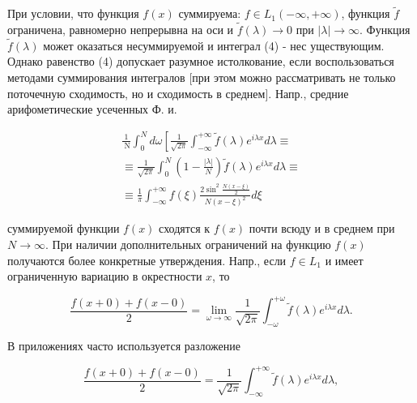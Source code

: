 \documentclass[10pt]{article}
\begin{document}
При условии, что функция $f(x)$ суммируема: $f \in L_{1}(-\infty,+\infty)$, функция $\tilde{f}$ ограничена, равномерно непрерывна на оси и $\tilde{f}(\lambda) \longrightarrow 0$ при $|\lambda| \longrightarrow \infty$. Функция $\tilde{f}(\lambda)$ может оказаться несуммируемой и интеграл (4) - нес уществующим. Однако равенство (4) допускает разумное истолкование, если воспользоваться методами суммирования интегралов [при этом можно рассматривать не только поточечную сходимость, но и сходимость в среднем]. Напр., средние арифометические усеченных Ф. и.



\[

\begin{gathered}

\frac{1}{\mathrm{~N}} \int_{0}^{N} d \omega\left[\frac{1}{\sqrt{2 \pi}} \int_{-\infty}^{+\infty} \tilde{f}(\lambda) e^{i \lambda x} d \lambda \equiv\right. \\

\equiv \frac{1}{\sqrt{2 \pi}} \int_{0}^{N}\left(1-\frac{|\lambda|}{N}\right) \tilde{f}(\lambda) e^{i \lambda x} d \lambda \equiv \\

\equiv \frac{1}{\pi} \int_{-\infty}^{+\infty} f(\xi) \frac{2 \sin ^{2} \frac{N(x-\xi)}{2}}{N(x-\xi)^{2}} d \xi

\end{gathered}

\]



суммируемой функции $f(x)$ сходятся к $f(x)$ почти всюду и в среднем при $N \rightarrow \infty$. При наличии дополнительных ограничений на функцию $f(x)$ получаются более конкретные утверждения. Напр., если $f \in L_{1}$ и имеет ограниченную вариацию в окрестности $x$, то



\[

\frac{f(x+0)+f(x-0)}{2}=\lim _{\omega \rightarrow \infty} \frac{1}{\sqrt{2 \pi}} \int_{-\omega}^{+\omega} \tilde{f}(\lambda) e^{i \lambda x} d \lambda .

\]



В приложениях часто используется разложение



\[

\frac{f(x+0)+f(x-0)}{2}=\frac{1}{\sqrt{2 \pi}} \int_{-\infty}^{+\infty} \tilde{f}(\lambda) e^{i \lambda x} d \lambda,

\]
\end{document}

